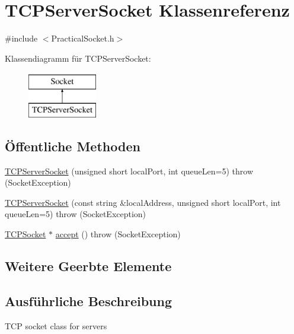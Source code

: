 \hypertarget{classTCPServerSocket}{\section{T\-C\-P\-Server\-Socket Klassenreferenz}
\label{classTCPServerSocket}
}


{\ttfamily \#include $<$Practical\-Socket.\-h$>$}

Klassendiagramm für T\-C\-P\-Server\-Socket\-:\begin{figure}[H]
\begin{center}
\leavevmode
\includegraphics[height=2.000000cm]{classTCPServerSocket}
\end{center}
\end{figure}
\subsection*{Öffentliche Methoden}
\begin{DoxyCompactItemize}
\item 
\hyperlink{classTCPServerSocket_ae559a3154527d09fe14a8e5ee1f53d7a}{T\-C\-P\-Server\-Socket} (unsigned short local\-Port, int queue\-Len=5)  throw (\-Socket\-Exception)
\item 
\hyperlink{classTCPServerSocket_a3908fecb1b038f7c14fcc7726f54d01d}{T\-C\-P\-Server\-Socket} (const string \&local\-Address, unsigned short local\-Port, int queue\-Len=5)  throw (\-Socket\-Exception)
\item 
\hyperlink{classTCPSocket}{T\-C\-P\-Socket} $\ast$ \hyperlink{classTCPServerSocket_a1d161137e1b069de7a7bfc14d3f8212c}{accept} ()  throw (\-Socket\-Exception)
\end{DoxyCompactItemize}
\subsection*{Weitere Geerbte Elemente}


\subsection{Ausführliche Beschreibung}
T\-C\-P socket class for servers 

